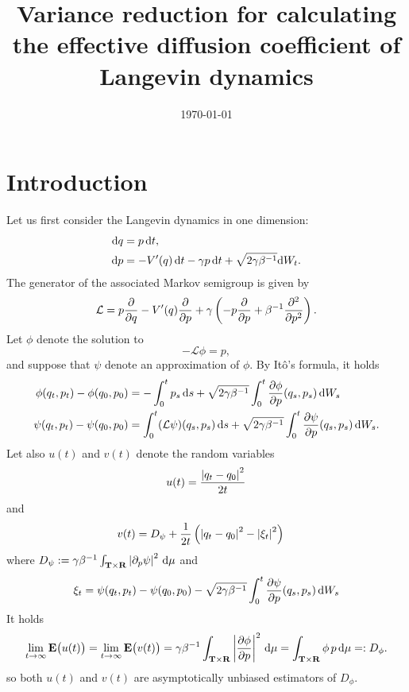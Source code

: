\documentclass[11pt,a4paper]{article}
\date{\today}
\title{Variance reduction for calculating the effective diffusion coefficient of Langevin dynamics}
\author{%
}
\newcommand{\expect}[0]{\mathbf{E}}
\newcommand{\real}{\mathbf R}
\newcommand{\torus}{\mathbf T}
\renewcommand{\d}{\mathrm d}
\theoremstyle{plain}
\numberwithin{equation}{section}
\begin{document}
\maketitle

\section{Introduction}%
Let us first consider the Langevin dynamics in one dimension:
\begin{subequations}
\begin{align}
    \label{eq:Langevin_q}
    \d q &= p \, \d t, \\
    \label{eq:Langevin_p}
    \d p &= - \derivative*{1}[V]{q}(q) \, \d t - \gamma p \, \d t + \sqrt{2 \gamma \beta^{-1}} \d W_t.
\end{align}
\end{subequations}
The generator of the associated Markov semigroup is given by
\[
    \mathcal L = p \derivative{1}{q} - \derivative*{1}[V]{q}(q) \derivative{1}{p} + \gamma \left( - p \derivative{1}{p} + \beta^{-1} \derivative{2}{p^2} \right).
\]
Let $\phi$ denote the solution to
\[
    - \mathcal L \phi = p,
\]
and suppose that $\psi$ denote an approximation of $\phi$.
By It\^o's formula, it holds
\begin{align*}
    \phi(q_t, p_t) - \phi(q_0, p_0) &= - \int_{0}^{t} p_s \, \d s + \sqrt{2 \gamma \beta^{-1}} \int_{0}^{t} \derivative{1}[\phi]{p}(q_s, p_s) \, \d W_s \\
    \psi(q_t, p_t) - \psi(q_0, p_0) &= \int_{0}^{t} (\mathcal L \psi) (q_s, p_s) \, \d s + \sqrt{2 \gamma \beta^{-1}} \int_{0}^{t} \derivative{1}[\psi]{p}(q_s, p_s) \, \d W_s.
\end{align*}
Let also $u(t)$ and $v(t)$ denote the random variables
\[
    u(t) = \frac{\abs{q_t - q_0}^2}{2t}
\]
and
\begin{align*}
    v(t) &= D_{\psi}+ \frac{1}{2t} \left( \abs{q_t - q_0}^2 - \abs{\xi_t}^2\right)
\end{align*}
where $D_{\psi} := \gamma \beta^{-1} \int_{\torus \times \real} \abs{\derivative{1}[\psi]{p}}^2 \, \d \mu$ and
 \[
    \xi_t = \psi(q_t, p_t) - \psi(q_0, p_0) - \sqrt{2 \gamma \beta^{-1}} \int_{0}^{t} \derivative{1}[\psi]{p}(q_s, p_s) \, \d W_s
 \]
It holds
\[
    \lim_{t \to \infty} \expect \bigl( u(t) \bigr) = \lim_{t \to \infty} \expect \bigl( v(t) \bigr)
    = \gamma \beta^{-1} \int_{\torus \times \real} \abs{\derivative{1}[\phi]{p}}^2 \, \d \mu
    = \int_{\torus \times \real} \phi \, p \, \d \mu =: D_{\phi}.
\]
so both $u(t)$ and $v(t)$ are asymptotically unbiased estimators of $D_{\phi}$.
\end{document}
